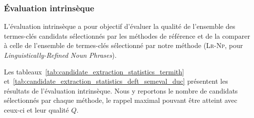       \subsubsection{Évaluation intrinsèque}
      \label{subsubsec:main:domain_independent_keyphrase_extraction-keyphrase_candidate_selection-evaluation-intrinsic_evaluation}
        L'évaluation intrinsèque a pour objectif d'évaluer la qualité de
        l'ensemble des termes-clés candidats sélectionnés par les méthodes de
        référence et de la comparer à celle de l'ensemble de termes-clés
        sélectionné par notre méthode (\textsc{Lr-Np}, pour
        \textit{Linguistically-Refined Noun Phrases}).

        Les tableaux~\ref{tab:candidate_extraction_statistics_termith}
        et~\ref{tab:candidate_extraction_statistics_deft_semeval_duc} présentent
        les résultats de l'évaluation intrinsèque. Nous y reportons le nombre de candidats
        sélectionnés par chaque méthode, le rappel maximal pouvant être atteint
        avec ceux-ci et leur qualité $Q$.

